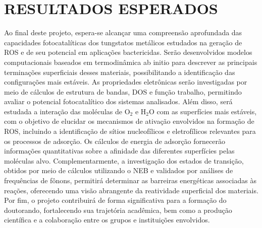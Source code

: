 \chapter{RESULTADOS ESPERADOS}

Ao final deste projeto, espera-se alcançar uma compreensão aprofundada das capacidades fotocatalíticas dos tungstatos metálicos estudados na geração de ROS e de seu potencial em aplicações bactericidas. Serão desenvolvidos modelos computacionais baseados em termodinâmica ab initio para descrever as principais terminações superficiais desses materiais, possibilitando a identificação das configurações mais estáveis. As propriedades eletrônicas serão investigadas por meio de cálculos de estrutura de bandas, DOS e função trabalho, permitindo avaliar o potencial fotocatalítico dos sistemas analisados. Além disso, será estudada a interação das moléculas de O$_2$ e H$_2$O com as superfícies mais estáveis, com o objetivo de elucidar os mecanismos de ativação envolvidos na formação de ROS, incluindo a identificação de sítios nucleofílicos e eletrofílicos relevantes para os processos de adsorção. Os cálculos de energia de adsorção fornecerão informações quantitativas sobre a afinidade das diferentes superfícies pelas moléculas alvo. Complementarmente, a investigação dos estados de transição, obtidos por meio de cálculos utilizando o NEB e validados por análises de frequências de fônons, permitirá determinar as barreiras energéticas associadas às reações, oferecendo uma visão abrangente da reatividade superficial dos materiais. Por fim, o projeto contribuirá de forma significativa para a formação do doutorando, fortalecendo sua trajetória acadêmica, bem como a produção científica e a colaboração entre os grupos e instituições envolvidos.


